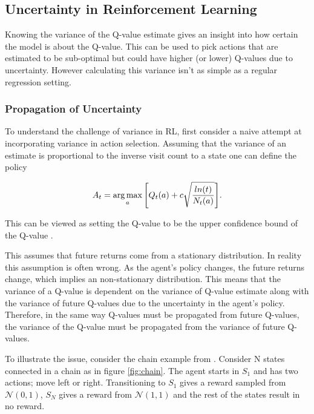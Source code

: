 \subsection{Uncertainty in Reinforcement Learning}

Knowing the variance of the Q-value estimate gives an insight into how certain the model is about the Q-value. This can be used to pick actions that are estimated to be sub-optimal but could have higher (or lower) Q-values due to uncertainty. However calculating this variance isn't as simple as a regular regression setting.

\subsubsection{Propagation of Uncertainty}

To understand the challenge of variance in RL, first consider a naive attempt at incorporating variance in action selection. Assuming that the variance of an estimate is proportional to the inverse visit count to a state one can define the policy

\begin{equation}
    A_t = \operatorname*{arg\,max}_a \Bigg[Q_t(a) + c\sqrt\frac{ln(t)}{N_t(a)}\Bigg].
    \label{eq:ucb}
\end{equation}

This can be viewed as setting the Q-value to be the upper confidence bound of the Q-value \citep{strehl_2008}\citep[p.~35-36]{sutton_barto_2018}.

This assumes that future returns come from a stationary distribution. In reality this assumption is often wrong. As the agent's policy changes, the future returns change, which implies an non-stationary distribution. This means that the variance of a Q-value is dependent on the variance of Q-value estimate along with the variance of future Q-values due to the uncertainty in the agent's policy. Therefore, in the same way Q-values must be propagated from future Q-values, the variance of the Q-value must be propagated from the variance of future Q-values. \citep{moerland_2017}

To illustrate the issue, consider the chain example from \cite{osband_2016}. Consider N states connected in a chain as in figure \ref{fig:chain}. The agent starts in $S_1$ and has two actions; move left or right. Transitioning to $S_1$ gives a reward sampled from $\mathcal{N}(0,1)$, $S_N$ gives a reward from $\mathcal{N}(1,1)$ and the rest of the states result in no reward.


